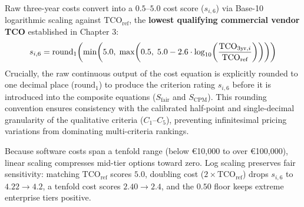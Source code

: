 \vspace{1mm}

Raw three-year costs convert into a $0.5\text{--}5.0$ cost score ($s_{i,6}$) via Base-10 logarithmic scaling against $\text{TCO}_{\text{ref}}$, the \textbf{lowest qualifying commercial vendor TCO} established in Chapter 3:
\begin{equation*}
    \setlength{\abovedisplayskip}{3pt}
    \setlength{\belowdisplayskip}{3pt}
    s_{i,6} = \text{round}_1\!\left(\min\!\left(5.0,\;\max\!\left(0.5,\; 5.0 - 2.6 \cdot \log_{10}\!\left(\frac{\text{TCO}_{3\text{yr},i}}{\text{TCO}_{\text{ref}}}\right)\right)\right)\right)
\end{equation*}
Crucially, the raw continuous output of the cost equation is explicitly rounded to one decimal place ($\text{round}_1$) to produce the criterion rating $s_{i,6}$ before it is introduced into the composite equations ($S_{\text{fair}}$ and $S_{\text{CPM}}$). This rounding convention ensures consistency with the calibrated half-point and single-decimal granularity of the qualitative criteria ($C_1\text{--}C_5$), preventing infinitesimal pricing variations from dominating multi-criteria rankings.

Because software costs span a tenfold range (below €10,000 to over €100,000), linear scaling compresses mid-tier options toward zero. Log scaling preserves fair sensitivity: matching $\text{TCO}_{\text{ref}}$ scores $5.0$, doubling cost ($2\times \text{TCO}_{\text{ref}}$) drops $s_{i,6}$ to $4.22 \to 4.2$, a tenfold cost scores $2.40 \to 2.4$, and the $0.50$ floor keeps extreme enterprise tiers positive.
